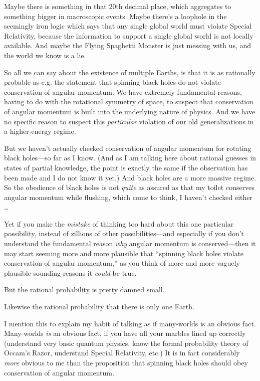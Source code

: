 {
 Maybe there is something in that 20th decimal place, which
aggregates to something bigger in macroscopic events. Maybe
there's a loophole in the seemingly iron logic which
says that any single global world must violate Special Relativity,
because the information to support a single global world is not locally
available. And maybe the Flying Spaghetti Monster is just messing with
us, and the world we know is a lie.}

{
 So all we can say about the existence of multiple Earths, is that
it is as rationally probable as e.g. the statement that spinning black
holes do not violate conservation of angular momentum. We have
extremely fundamental reasons, having to do with the rotational
symmetry of space, to suspect that conservation of angular momentum is
built into the underlying nature of physics. And we have no specific
reason to suspect this \textit{particular} violation of our old
generalizations in a higher-energy regime.}

{
 But we haven't actually checked conservation of
angular momentum for rotating black holes---so far as I know. (And as I
am talking here about rational guesses in states of partial knowledge,
the point is exactly the same if the observation has been made and I do
not know it yet.) And black holes are a more massive regime. So the
obedience of black holes is not \textit{quite} as assured as that my
toilet conserves angular momentum while flushing, which come to think,
I haven't checked either \ldots}

{
 Yet if you make the \textit{mistake} of thinking too hard about
this one particular possibility, instead of zillions of other
possibilities---and especially if you don't understand
the fundamental reason \textit{why} angular momentum is
conserved---then it may start seeming more and more plausible that
``spinning black holes violate conservation of angular
momentum,'' as you think of more and more vaguely
plausible-sounding reasons it \textit{could} be true.}

{
 But the rational probability is pretty damned small.}

{
 Likewise the rational probability that there is only one Earth.}

{
 I mention this to explain my habit of talking as if many-worlds is
an obvious fact. Many-worlds \textit{is} an obvious fact, if you have
all your marbles lined up correctly (understand very basic quantum
physics, know the formal probability theory of Occam's
Razor, understand Special Relativity, etc.) It is in fact considerably
\textit{more} obvious to me than the proposition that spinning black
holes should obey conservation of angular momentum.}

